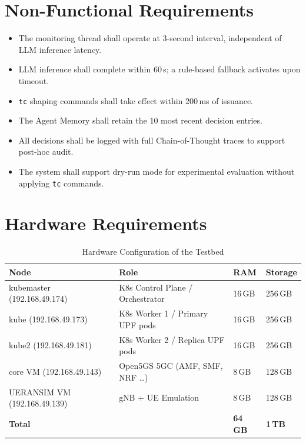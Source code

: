 \section{Non-Functional Requirements}

\begin{itemize}[leftmargin=*]
  \item The monitoring thread shall operate at 3-second interval, independent of LLM inference latency.
  \item LLM inference shall complete within 60\,s; a rule-based fallback activates upon timeout.
  \item \texttt{tc} shaping commands shall take effect within 200\,ms of issuance.
  \item The Agent Memory shall retain the 10 most recent decision entries.
  \item All decisions shall be logged with full Chain-of-Thought traces to support post-hoc audit.
  \item The system shall support dry-run mode for experimental evaluation without applying \texttt{tc} commands.
\end{itemize}

\section{Hardware Requirements}

\begin{table}[H]
\centering
\caption{Hardware Configuration of the Testbed}
\label{tab:hardware}
\begin{tabular}{llll}
\toprule
\textbf{Node} & \textbf{Role} & \textbf{RAM} & \textbf{Storage} \\
\midrule
kubemaster (192.168.49.174) & K8s Control Plane / Orchestrator & 16\,GB & 256\,GB \\
kube       (192.168.49.173) & K8s Worker 1 / Primary UPF pods  & 16\,GB & 256\,GB \\
kube2      (192.168.49.181) & K8s Worker 2 / Replica UPF pods  & 16\,GB & 256\,GB \\
core VM    (192.168.49.143) & Open5GS 5GC (AMF, SMF, NRF \ldots) & 8\,GB  & 128\,GB \\
UERANSIM VM (192.168.49.139)& gNB + UE Emulation               & 8\,GB  & 128\,GB \\
\midrule
\multicolumn{2}{l}{\textbf{Total}} & \textbf{64\,GB} & \textbf{1\,TB} \\
\bottomrule
\end{tabular}
\end{table}

